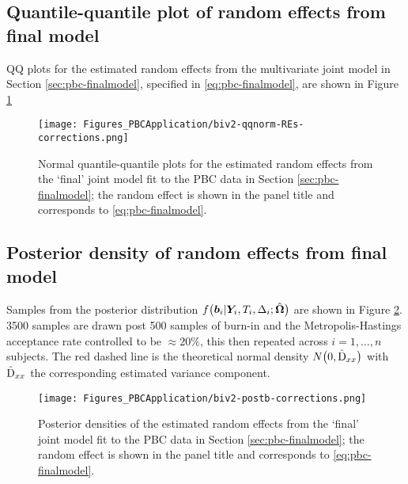 \subsection{Quantile-quantile plot of random effects from final model}\label{sec:appendix-suppfigs-finalQQ-REs}
QQ plots for the estimated random effects from the multivariate joint model in Section \ref{sec:pbc-finalmodel}, specified in \eqref{eq:pbc-finalmodel}, are shown in Figure \ref{fig:appendix-suppfigs-finalQQ-REs}
\begin{figure}[ht]
    \centering
    \texttt{[image: Figures\_PBCApplication/biv2-qqnorm-REs-corrections.png]}
    \caption{Normal quantile-quantile plots for the estimated random effects from the `final' joint model fit to the PBC data in Section \ref{sec:pbc-finalmodel}; the random effect is shown in the panel title and corresponds to \eqref{eq:pbc-finalmodel}.}
    \label{fig:appendix-suppfigs-finalQQ-REs}
\end{figure}

\subsection{Posterior density of random effects from final model}\label{sec:appendix-suppfigs-finalpostREs}
Samples from the posterior distribution $f\big(\bm{b}_i|\bm{Y}_i,T_i,\Delta_i;\hat{\bm{\Omega}}\big)$ are shown in Figure \ref{fig:appendix-suppfigs-finalpostREs}. 3500 samples are drawn post 500 samples of burn-in and the Metropolis-Hastings acceptance rate controlled to be $\approx20\%$, this then repeated across $i=1,\ldots,n$ subjects. The red dashed line is the theoretical normal density $N\big(0, \hat{\mathrm{D}}_{xx}\big)$ with $\hat{\mathrm{D}}_{xx}$ the corresponding estimated variance component.

\begin{figure}[ht]
    \centering
    \texttt{[image: Figures\_PBCApplication/biv2-postb-corrections.png]}
    \caption{Posterior densities of the estimated random effects from the `final' joint model fit to the PBC data in Section \ref{sec:pbc-finalmodel}; the random effect is shown in the panel title and corresponds to \eqref{eq:pbc-finalmodel}.}
    \label{fig:appendix-suppfigs-finalpostREs}
\end{figure}


\resettocappx